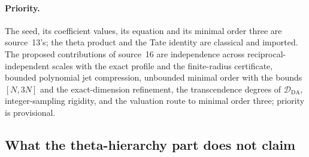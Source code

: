 \documentclass[11pt]{article}
\numberwithin{equation}{section}
\theoremstyle{definition}
\theoremstyle{remark}
\begin{document}
\paragraph{Priority.}
The seed, its coefficient values, its equation and its minimal order three are
source~13's; the theta product and the Tate identity are classical and
imported. The proposed contributions of source~16 are independence across
reciprocal-independent scales with the exact profile and the finite-radius
certificate, bounded polynomial jet compression, unbounded minimal order with
the bounds $[N,3N]$ and the exact-dimension refinement, the transcendence
degrees of $\mathcal D_{\mathrm{DA}}$, integer-sampling rigidity, and the
valuation route to minimal order three; priority is provisional.

\subsection{What the theta-hierarchy part does not claim}
\label{hol:th:sub:nonclaims}
\end{document}
